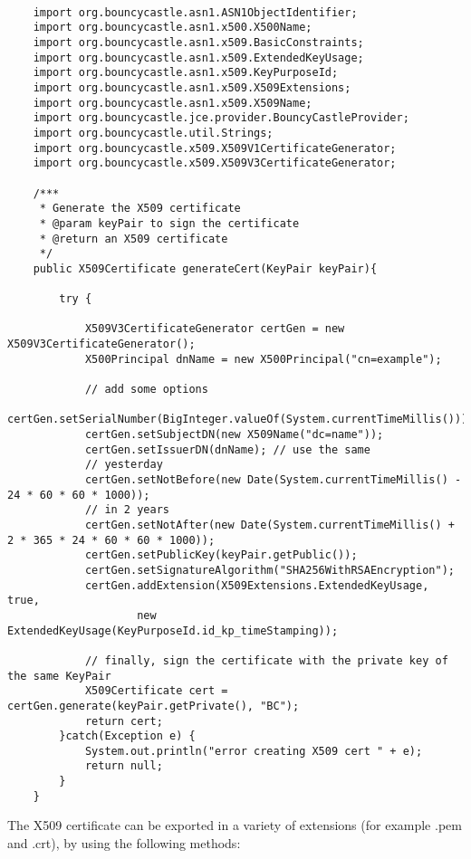 \documentclass{article}
\begin{document}
\begin{verbatim}

	import org.bouncycastle.asn1.ASN1ObjectIdentifier;
	import org.bouncycastle.asn1.x500.X500Name;
	import org.bouncycastle.asn1.x509.BasicConstraints;
	import org.bouncycastle.asn1.x509.ExtendedKeyUsage;
	import org.bouncycastle.asn1.x509.KeyPurposeId;
	import org.bouncycastle.asn1.x509.X509Extensions;
	import org.bouncycastle.asn1.x509.X509Name;
	import org.bouncycastle.jce.provider.BouncyCastleProvider;
	import org.bouncycastle.util.Strings;
	import org.bouncycastle.x509.X509V1CertificateGenerator;
	import org.bouncycastle.x509.X509V3CertificateGenerator;
	
	/***
	 * Generate the X509 certificate
	 * @param keyPair to sign the certificate
	 * @return an X509 certificate
	 */
	public X509Certificate generateCert(KeyPair keyPair){

		try {

			X509V3CertificateGenerator certGen = new X509V3CertificateGenerator();
			X500Principal dnName = new X500Principal("cn=example");

			// add some options
			certGen.setSerialNumber(BigInteger.valueOf(System.currentTimeMillis()));
			certGen.setSubjectDN(new X509Name("dc=name"));
			certGen.setIssuerDN(dnName); // use the same
			// yesterday
			certGen.setNotBefore(new Date(System.currentTimeMillis() - 24 * 60 * 60 * 1000));
			// in 2 years
			certGen.setNotAfter(new Date(System.currentTimeMillis() + 2 * 365 * 24 * 60 * 60 * 1000));
			certGen.setPublicKey(keyPair.getPublic());
			certGen.setSignatureAlgorithm("SHA256WithRSAEncryption");
			certGen.addExtension(X509Extensions.ExtendedKeyUsage, true,
					new ExtendedKeyUsage(KeyPurposeId.id_kp_timeStamping));

			// finally, sign the certificate with the private key of the same KeyPair
			X509Certificate cert = certGen.generate(keyPair.getPrivate(), "BC");
			return cert;
		}catch(Exception e) {
			System.out.println("error creating X509 cert " + e);
			return null;
		}
	}
\end{verbatim}
The X509 certificate can be exported in a variety of extensions (for example .pem and .crt), by using the following methods:
\end{document}
